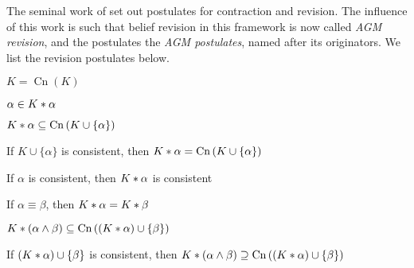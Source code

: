 {The seminal work of \textcite{alchourron1985logic} set out postulates for
contraction and revision. The influence of this work is such that belief
revision in this framework is now called \emph{AGM revision}, and the
postulates the \emph{AGM postulates}, named after its originators. We list the
revision postulates below.\footnotemark{}


\newcommand{\cn}[1]{\operatorname{Cn}\left({#1}\right)}

\begin{axiomlist}

    \begin{axiom}
        $K = \cn{K}$
    \end{axiom}

    \begin{axiom}
        $\alpha \in K \ast \alpha$
    \end{axiom}

    \begin{axiom}
        $K \reviseby \alpha \subseteq \cn{K \cup \{\alpha\}}$
    \end{axiom}

    \begin{axiom}
        If $K \cup \{\alpha\}$ is consistent, then $K \reviseby \alpha
        = \cn{K \cup \{\alpha\}}$
    \end{axiom}

    \begin{axiom}
        If $\alpha$ is consistent, then $K \ast \alpha$ is consistent
    \end{axiom}

    \begin{axiom}
        If $\alpha \equiv \beta$, then $K \ast \alpha = K \ast \beta$
    \end{axiom}

    \begin{axiom}
        $K \reviseby (\alpha \land \beta) \subseteq \cn{(K \reviseby \alpha)
        \cup \{\beta\}}$
    \end{axiom}

    \begin{axiom}
        If $(K \ast \alpha) \cup \{\beta\}$ is consistent, then $K
        \reviseby (\alpha \land \beta) \supseteq \cn{(K \reviseby \alpha) \cup
        \{\beta\}}$
    \end{axiom}


\end{axiomlist}}
